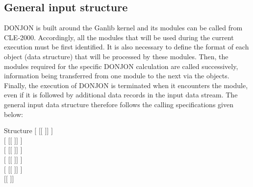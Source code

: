 \subsection{General input structure}\label{sect:glob}

\vskip 0.2cm
DONJON is built around the Ganlib kernel and its modules can be called from CLE-2000.\cite{ganlib5,cle2000}
Accordingly, all the modules that will be used during the current execution
must be first identified. It is also necessary to define the format of each object
(data structure) that will be processed by these modules. Then, the modules
required for the specific DONJON calculation are called successively,
information being transferred from one module to the next via the objects.
Finally, the execution of DONJON is terminated when it encounters the
 module, even if it is followed by additional data records in the
input data stream. The general input data structure therefore follows the
calling specifications given below:

\begin{DataStructure}{Structure }
$[$  $[[$  $]]$ \moc{;} $]$ \\
$[$  $[[$  $]]$ \moc{;} $]$ \\
$[$  $[[$  $]]$ \moc{;} $]$ \\
$[$  $[[$  $]]$ \moc{;} $]$ \\
$[$  $[[$  $]]$ \moc{;} $]$ \\
$[[$   \moc{;} $]]$ \\
 \moc{;}
\end{DataStructure}

